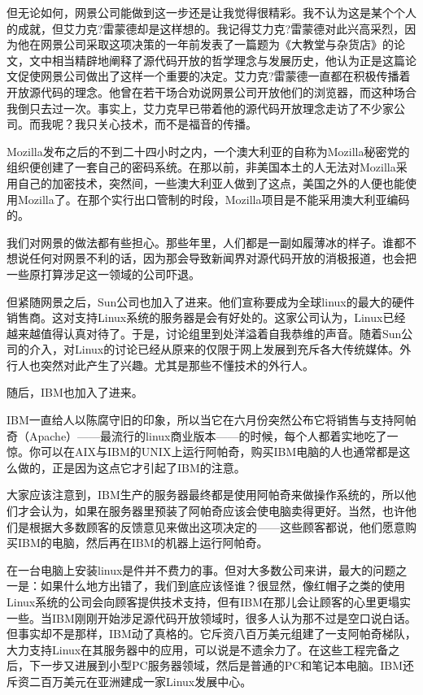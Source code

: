 但无论如何，网景公司能做到这一步还是让我觉得很精彩。我不认为这是某个个人的成就，但艾力克?雷蒙德却是这样想的。我记得艾力克?雷蒙德对此兴高采烈，因为他在网景公司采取这项决策的一年前发表了一篇题为《大教堂与杂货店》的论文，文中相当精辟地阐释了源代码开放的哲学理念与发展历史，他认为正是这篇论文促使网景公司做出了这样一个重要的决定。艾力克?雷蒙德一直都在积极传播着开放源代码的理念。他曾在若干场合劝说网景公司开放他们的浏览器，而这种场合我倒只去过一次。事实上，艾力克早已带着他的源代码开放理念走访了不少家公司。而我呢？我只关心技术，而不是福音的传播。

Mozilla发布之后的不到二十四小时之内，一个澳大利亚的自称为Mozilla秘密党的组织便创建了一套自己的密码系统。在那以前，非美国本土的人无法对Mozilla采用自己的加密技术，突然间，一些澳大利亚人做到了这点，美国之外的人便也能使用Mozilla了。在那个实行出口管制的时段，Mozilla项目是不能采用澳大利亚编码的。

我们对网景的做法都有些担心。那些年里，人们都是一副如履薄冰的样子。谁都不想说任何对网景不利的话，因为那会导致新闻界对源代码开放的消极报道，也会把一些原打算涉足这一领域的公司吓退。

但紧随网景之后，Sun公司也加入了进来。他们宣称要成为全球linux的最大的硬件销售商。这对支持Linux系统的服务器是会有好处的。这家公司认为，Linux已经越来越值得认真对待了。于是，讨论组里到处洋溢着自我恭维的声音。随着Sun公司的介入，对Linux的讨论已经从原来的仅限于网上发展到充斥各大传统媒体。外行人也突然对此产生了兴趣。尤其是那些不懂技术的外行人。

随后，IBM也加入了进来。

IBM一直给人以陈腐守旧的印象，所以当它在六月份突然公布它将销售与支持阿帕奇（Apache）——最流行的linux商业版本——的时候，每个人都着实地吃了一惊。你可以在AIX与IBM的UNIX上运行阿帕奇，购买IBM电脑的人也通常都是这么做的，正是因为这点它才引起了IBM的注意。

大家应该注意到，IBM生产的服务器最终都是使用阿帕奇来做操作系统的，所以他们才会认为，如果在服务器里预装了阿帕奇应该会使电脑卖得更好。当然，也许他们是根据大多数顾客的反馈意见来做出这项决定的——这些顾客都说，他们愿意购买IBM的电脑，然后再在IBM的机器上运行阿帕奇。

在一台电脑上安装linux是件并不费力的事。但对大多数公司来讲，最大的问题之一是：如果什么地方出错了，我们到底应该怪谁？很显然，像红帽子之类的使用Linux系统的公司会向顾客提供技术支持，但有IBM在那儿会让顾客的心里更塌实一些。当IBM刚刚开始涉足源代码开放领域时，很多人认为那不过是空口说白话。但事实却不是那样，IBM动了真格的。它斥资八百万美元组建了一支阿帕奇梯队，大力支持Linux在其服务器中的应用，可以说是不遗余力了。在这些工程完备之后，下一步又进展到小型PC服务器领域，然后是普通的PC和笔记本电脑。IBM还斥资二百万美元在亚洲建成一家Linux发展中心。

